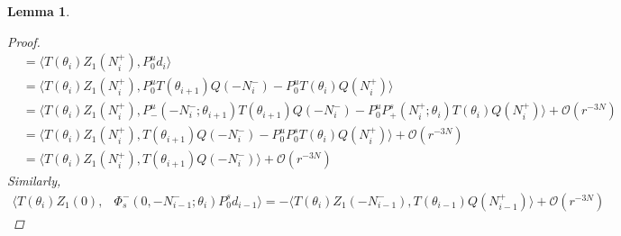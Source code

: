 \documentclass[12pt]{article}
\newtheorem{lemma}{Lemma}
\begin{document}
\begin{lemma}
\begin{proof}
\begin{align*}
&= \langle T(\theta_i) Z_1(N_i^+), P_0^u d_i \rangle \\
&= \langle T(\theta_i) Z_1(N_i^+), P_0^u T(\theta_{i+1}) Q(-N_i^-) - P_0^u T(\theta_i) Q(N_i^+) \rangle \\
&= \langle T(\theta_i) Z_1(N_i^+), P_-^u(-N_i^-; \theta_{i+1}) T(\theta_{i+1}) Q(-N_i^-) - P_0^u P_+^s(N_i^+; \theta_i)  T(\theta_i) Q(N_i^+) \rangle + \mathcal{O}(r^{-3N}) \\
&= \langle T(\theta_i) Z_1(N_i^+), T(\theta_{i+1}) Q(-N_i^-) - P_0^u P_0^s T(\theta_i) Q(N_i^+) \rangle + \mathcal{O}(r^{-3N}) \\
&= \langle T(\theta_i) Z_1(N_i^+), T(\theta_{i+1}) Q(-N_i^-) \rangle + \mathcal{O}(r^{-3N}) 
\end{align*}
Similarly,
\begin{align*}
\langle T(\theta_i) Z_1(0), &\Phi_s^-(0, -N_{i-1}^-; \theta_i) P_0^s d_{i-1} \rangle
= -\langle T(\theta_i) Z_1(-N_{i-1}^-), T(\theta_{i-1}) Q(N_{i-1}^+) \rangle + \mathcal{O}(r^{-3N}) 
\end{align*}


\end{proof}
\end{lemma}
\end{document}
